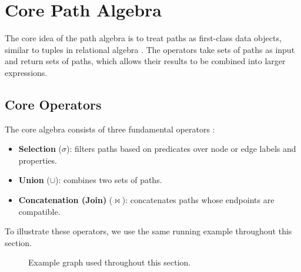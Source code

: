 \section{Core Path Algebra}

The core idea of the path algebra is to treat paths as first-class data objects, similar to tuples in relational algebra \cite{angles2024path}. The operators take sets of paths as input and return sets of paths, which allows their results to be combined into larger expressions.

\subsection{Core Operators}

The core algebra consists of three fundamental operators \cite{angles2024path}:

\begin{itemize}
    \item \textbf{Selection} ($\sigma$): filters paths based on predicates over node or edge labels and properties.
    \item \textbf{Union} ($\cup$): combines two sets of paths.
    \item \textbf{Concatenation (Join)} ($\bowtie$): concatenates paths whose endpoints are compatible.
\end{itemize}



To illustrate these operators, we use the same running example throughout this section.

\begin{figure}[ht]
    \centering
    \caption{Example graph used throughout this section.}
\end{figure}

